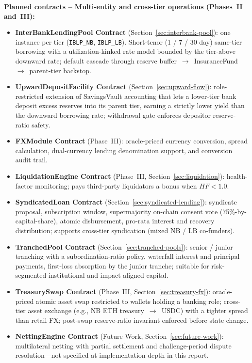 \documentclass[12pt,a4paper]{report}
\begin{document}
\textbf{Planned contracts -- Multi-entity and cross-tier operations (Phases~II and~III):}
\begin{itemize}[noitemsep]
\item \textbf{InterBankLendingPool Contract} (Section~\ref{sec:interbank-pool}): one instance per tier (\texttt{IBLP\_NB}, \texttt{IBLP\_LB}). Short-tenor (1 / 7 / 30 day) same-tier borrowing with a utilization-kinked rate model bounded by the tier-above downward rate; default cascade through reserve buffer~$\to$~InsuranceFund~$\to$~parent-tier backstop.
\item \textbf{UpwardDepositFacility Contract} (Section~\ref{sec:upward-flow}): role-restricted extension of SavingsVault accounting that lets a lower-tier bank deposit excess reserves into its parent tier, earning a strictly lower yield than the downward borrowing rate; withdrawal gate enforces depositor reserve-ratio safety.
\item \textbf{FXModule Contract} (Phase~III): oracle-priced currency conversion, spread calculation, dual-currency lending denomination support, and conversion audit trail.
\item \textbf{LiquidationEngine Contract} (Phase~III, Section~\ref{sec:liquidation}): health-factor monitoring; pays third-party liquidators a bonus when $HF < 1.0$.
\item \textbf{SyndicatedLoan Contract} (Section~\ref{sec:syndicated-lending}): syndicate proposal, subscription window, supermajority on-chain consent vote (75\%-by-capital-share), atomic disbursement, pro-rata interest and recovery distribution; supports cross-tier syndication (mixed NB / LB co-funders).
\item \textbf{TranchedPool Contract} (Section~\ref{sec:tranched-pools}): senior / junior tranching with a subordination-ratio policy, waterfall interest and principal payments, first-loss absorption by the junior tranche; suitable for risk-segmented institutional and impact-aligned capital.
\item \textbf{TreasurySwap Contract} (Phase~III, Section~\ref{sec:treasury-fx}): oracle-priced atomic asset swap restricted to wallets holding a banking role; cross-tier asset exchange (e.g., NB ETH treasury~$\to$~USDC) with a tighter spread than retail FX; post-swap reserve-ratio invariant enforced before state change.
\item \textbf{NettingEngine Contract} (Future Work, Section~\ref{sec:future-work}): multilateral netting with partial settlement and challenge-period dispute resolution---not specified at implementation depth in this report.
\end{itemize}
\end{document}
